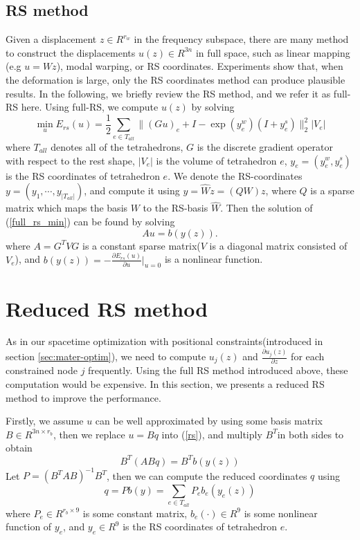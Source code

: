 \documentclass[9pt,twocolumn]{extarticle}
\begin{document}
\subsection{RS method}
Given a displacement $z\in R^{r_w}$ in the frequency subspace, there are many
method to construct the displacements $u(z)\in R^{3n}$ in full space, such as
linear mapping (e.g $u = Wz$), modal warping, or RS coordinates. Experiments
show that, when the deformation is large, only the RS coordinates method can
produce plausible results. In the following, we briefly review the RS method,
and we refer it as full-RS here. Using full-RS, we compute $u(z)$ by solving
\begin{equation}\label{full_rs_min}
  \min_{u} E_{rs}(u)=\frac{1}{2}\sum_{e\in T_{all}}\|(Gu)_e + I - \exp({y_e^w})(I+y_e^s)\|_2^2|V_e|
\end{equation}
where $T_{all}$ denotes all of the tetrahedrons, $G$ is the discrete gradient
operator with respect to the rest shape, $|V_e|$ is the volume of tetrahedron
$e$, $y_e=(y_e^w,y_e^s)$ is the RS coordinates of tetrahedron $e$. We denote the
RS-coordinates $y=(y_1,\cdots,y_{|T_{all}|})$, and compute it using
$y=\hat{W}z=(QW)z$, where $Q$ is a sparse matrix which maps the basis $W$ to the
RS-basis $\hat{W}$. Then the solution of (\ref{full_rs_min}) can be found by
solving
\begin{equation} \label{rs}
  Au = b(y(z)).
\end{equation}
where $A=G^TVG$ is a constant sparse matrix($V$ is a diagonal matrix consisted
of $V_e$), and $b(y(z))=-\frac{\partial{E_{rs}(u)}}{\partial{u}}|_{u=0}$ is a
nonlinear function.

\section{Reduced RS method}\label{sec:reduced-rs-method}
As in our spacetime optimization with positional constraints(introduced in
section \ref{sec:mater-optim}), we need to compute $u_j(z)$ and
$\frac{\partial{u_j(z)}}{\partial{z}}$ for each constrained node $j$
frequently. Using the full RS method introduced above, these computation would
be expensive. In this section, we presents a reduced RS method to improve the
performance.

Firstly, we assume $u$ can be well approximated by using some basis matrix $B\in
R^{3n\times r_b}$, then we replace $u = Bq$ into (\ref{rs}), and multiply
$B^T$in both sides to obtain
\begin{equation} \label{reduced_rs1} B^T(ABq) = B^Tb(y(z))
\end{equation} Let $P = (B^TAB)^{-1}B^T$, then we can compute the reduced
coordinates $q$ using
\begin{equation} \label{reduced_rs2} 
  q = Pb(y) = \sum_{e\in{T_{all}}}P_e{b_e(y_e(z))}
\end{equation} where $P_e\in R^{r_b\times 9}$ is some constant matrix, $b_e(\cdot)\in
R^{9}$ is some nonlinear function of $y_e$, and $y_e\in R^9$ is
the RS coordinates of tetrahedron $e$. 
\end{document}
